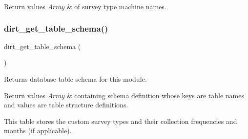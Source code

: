 \begin{DoxyRetVals}{Return values}
{\em Array} & of survey type machine names. \\
\hline
\end{DoxyRetVals}
\mbox{\label{dirt_8table__schema_8inc_aca1fa6c60ceaf1a0d104bed6355379f3}} 
\subsubsection{\texorpdfstring{dirt\+\_\+get\+\_\+table\+\_\+schema()}{dirt\_get\_table\_schema()}}
{\footnotesize\ttfamily dirt\+\_\+get\+\_\+table\+\_\+schema (\begin{DoxyParamCaption}{ }\end{DoxyParamCaption})}

Returns database table schema for this module.


\begin{DoxyRetVals}{Return values}
{\em Array} & containing schema definition whose keys are table names and values are table structure definitions. \\
\hline
\end{DoxyRetVals}
This table stores the custom survey types and their collection frequencies and months (if applicable).